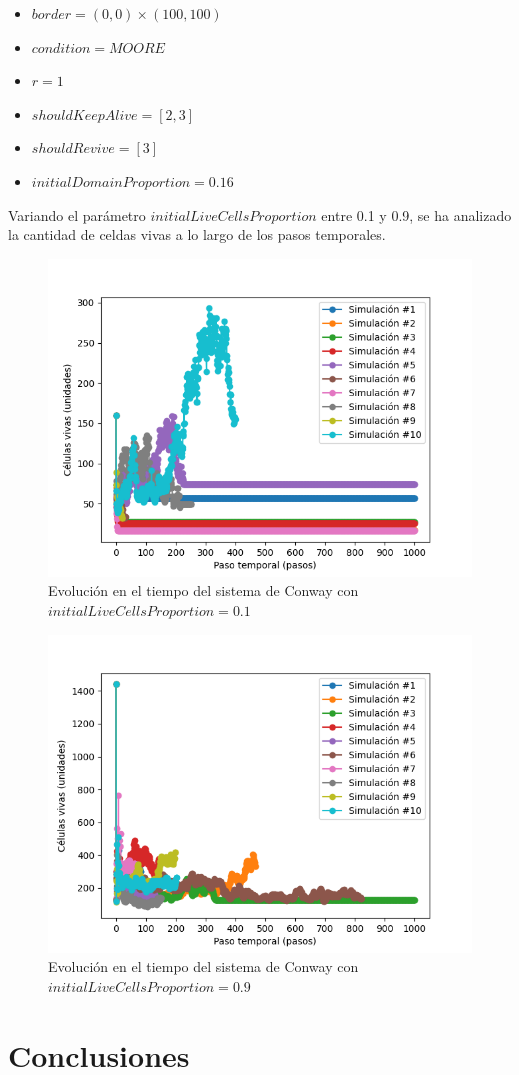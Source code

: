 \documentclass[11pt]{article}
\begin{document}
    \begin{itemize}
        \item $border = (0, 0) \times (100, 100)$
        \item $condition = MOORE$
        \item $r = 1$
        \item $shouldKeepAlive = [2, 3]$
        \item $shouldRevive = [3]$
        \item $initialDomainProportion = 0.16$
    \end{itemize}
    Variando el parámetro $initialLiveCellsProportion$ entre 0.1 y 0.9, se ha analizado la cantidad de celdas vivas
    a lo largo de los pasos temporales.
    \begin{figure}[H]
        \centering
        \includegraphics[width=0.6\linewidth]{conway2d/size_i10}
        \caption{Evolución en el tiempo del sistema de Conway con $initialLiveCellsProportion = 0.1$}
        \label{fig:conway2d_i10}
    \end{figure}
    \begin{figure}[H]
        \centering
        \includegraphics[width=0.6\linewidth]{conway2d/size_i90}
        \caption{Evolución en el tiempo del sistema de Conway con $initialLiveCellsProportion = 0.9$}
        \label{fig:conway2d_i90}
    \end{figure}

    \section{Conclusiones}\label{sec:conclusiones}
\end{document}
